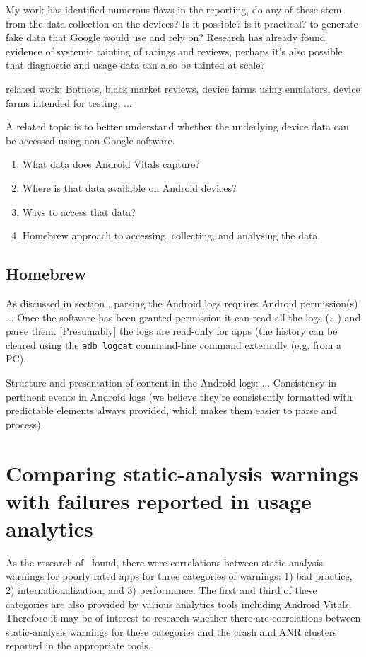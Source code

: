 My work has identified numerous flaws in the reporting, do any of these stem from the data collection on the devices? Is it possible? is it practical? to generate fake data that Google would use and rely on? Research has already found evidence of systemic tainting of ratings and reviews, perhaps it's also possible that diagnostic and usage data can also be tainted at scale?

related work: Botnets, black market reviews, device farms using emulators, device farms intended for testing, ...

A related topic is to better understand whether the underlying device data can be accessed using non-Google software. 

\begin{enumerate}
    \item What data does Android Vitals capture?
    \item Where is that data available on Android devices?
    \item Ways to access that data?
    \item Homebrew approach to accessing, collecting, and analysing the data.
\end{enumerate}

\subsection{Homebrew}
As discussed in section \href{platform-level-analytics}{\emph{}}, parsing the Android logs requires Android permission(s) ... Once the software has been granted permission it can read all the logs (...) and parse them. [Presumably] the logs are read-only for apps (the history can be cleared using the \texttt{adb logcat} command-line command externally (e.g. from a PC).

Structure and presentation of content in the Android logs: ...
Consistency in pertinent events in Android logs (we believe they're consistently formatted with predictable elements always provided, which makes them easier to parse and process).



\section{Comparing static-analysis warnings with failures reported in usage analytics}
As the research of~\citep{khalid2016_examining_the_relationship_between_findbugs_warnings_and_app_ratings} found, there were correlations between static analysis warnings for poorly rated apps for three categories of warnings: 1) bad practice, 2) internationalization, and 3) performance. The first and third of these categories are also provided by various analytics tools including Android Vitals. Therefore it may be of interest to research whether there are correlations between static-analysis warnings for these categories and the crash and ANR clusters reported in the appropriate tools. 


